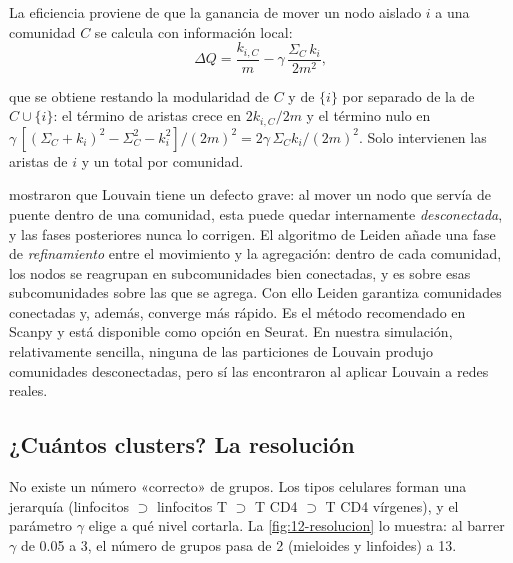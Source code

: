 La eficiencia proviene de que la ganancia de mover un nodo aislado $i$ a una comunidad $C$ se calcula con información local:
\begin{equation}\label{eq:12-deltaq}
\Delta Q = \frac{k_{i,C}}{m}-\gamma\,\frac{\Sigma_C\,k_i}{2m^2},
\end{equation}
\begin{simbolos}
\end{simbolos}
que se obtiene restando la modularidad de $C$ y de $\{i\}$ por separado de la de $C\cup\{i\}$: el término de aristas crece en $2k_{i,C}/2m$ y el término nulo en $\gamma\,[(\Sigma_C+k_i)^2-\Sigma_C^2-k_i^2]/(2m)^2=2\gamma\,\Sigma_Ck_i/(2m)^2$. Solo intervienen las aristas de $i$ y un total por comunidad.

\textcite{c12-traag2019} mostraron que Louvain tiene un defecto grave: al mover un nodo que servía de puente dentro de una comunidad, esta puede quedar internamente \emph{desconectada}, y las fases posteriores nunca lo corrigen. El algoritmo de Leiden añade una fase de \emph{refinamiento} entre el movimiento y la agregación: dentro de cada comunidad, los nodos se reagrupan en subcomunidades bien conectadas, y es sobre esas subcomunidades sobre las que se agrega. Con ello Leiden garantiza comunidades conectadas y, además, converge más rápido. Es el método recomendado en Scanpy y está disponible como opción en Seurat. En nuestra simulación, relativamente sencilla, ninguna de las particiones de Louvain produjo comunidades desconectadas, pero \textcite{c12-traag2019} sí las encontraron al aplicar Louvain a redes reales.

\subsection{¿Cuántos clusters? La resolución}

No existe un número «correcto» de grupos. Los tipos celulares forman una jerarquía (linfocitos $\supset$ linfocitos T $\supset$ T CD4 $\supset$ T CD4 vírgenes), y el parámetro $\gamma$ elige a qué nivel cortarla. La \cref{fig:12-resolucion} lo muestra: al barrer $\gamma$ de \num{0.05} a 3, el número de grupos pasa de 2 (mieloides y linfoides) a 13.

